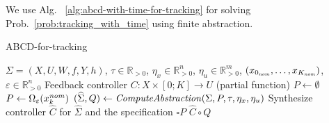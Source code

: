 We use Alg.~ \ref{alg:abcd-with-time-for-tracking} for solving Prob.~\ref{prob:tracking_with_time} using finite abstraction.




\begin{algorithm}
	\caption{ABCD-for-tracking}
	\label{alg:abcd-with-time-for-tracking}
	\begin{algorithmic}[1]
		\Require $\Sigma=(X,U,W,f,Y,h)$, $\tau \in \mathbb{R}_{>0}$, $\eta_x\in \mathbb{R}^n_{>0}$, $\eta_u\in \mathbb{R}^m_{>0}$, $(x_{0_{\mathit{nom}}},\ldots,x_{K_{\mathit{nom}}})$, $\varepsilon \in \mathbb{R}_{>0}^{n}$
		\Ensure Feedback controller $C\colon X\times [0;K]\to U$ (partial function)
		\State $P \gets \emptyset$
		\State $P \gets \Omega_{\varepsilon}(x_k^{\mathit{nom}})$
		\EndFor
		\State $(\widehat{\Sigma},Q) \gets \mathit{ComputeAbstraction}(\Sigma, P, \tau, \eta_{x} , \eta_u)$
		\State Synthesize controller $\widehat{C}$ for $\widehat{\Sigma}$ and the specification $\square P$ %
		\State \Return $\widehat{C}\circ Q$
	\end{algorithmic}
\end{algorithm}

